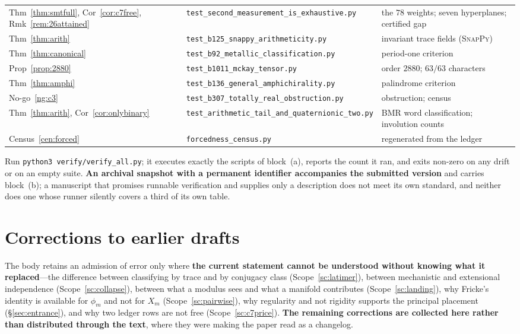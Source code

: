 \documentclass[11pt,reqno]{amsart}
\theoremstyle{plain}
\theoremstyle{definition}
\theoremstyle{remark}
\begin{document}
\begin{table}[h]
\begin{tabular}{@{}p{}p{}p{}@{}}
Thm~\ref{thm:smtfull}, Cor~\ref{cor:c7free}, Rmk~\ref{rem:26attained} & \texttt{test\_second\_measurement\_is\_exhaustive.py} & the $78$ weights; seven hyperplanes; certified gap\\
Thm~\ref{thm:arith} & \texttt{test\_b125\_snappy\_arithmeticity.py} & invariant trace fields (\textsc{SnapPy})\\
Thm~\ref{thm:canonical} & \texttt{test\_b92\_metallic\_classification.py} & period-one criterion\\
Prop~\ref{prop:2880} & \texttt{test\_b1011\_mckay\_tensor.py} & order $2880$; $63/63$ characters\\
Thm~\ref{thm:amphi} & \texttt{test\_b136\_general\_amphichirality.py} & palindrome criterion\\
No-go~\ref{ng:c3} & \texttt{test\_b307\_totally\_real\_obstruction.py} & obstruction; census\\
Thm~\ref{thm:arith}, Cor~\ref{cor:onlybinary} & \texttt{test\_arithmetic\_tail\_and\_quaternionic\_two.py} & BMR word classification; involution counts\\

Census~\ref{cen:forced} & \texttt{forcedness\_census.py} & regenerated from the ledger\\
\bottomrule
\end{tabular}
\end{table}

\noindent Run \texttt{python3 verify/verify\_all.py}; it executes exactly the scripts of
block~(a), reports the count it ran, and exits non-zero on any drift or on an empty
suite. \textbf{An archival snapshot with a permanent identifier accompanies the submitted
version} and carries block~(b); a manuscript that promises runnable verification and
supplies only a description does not meet its own standard, and neither does one whose
runner silently covers a third of its own table.

\section{Corrections to earlier drafts}\label{app:corrections}

The body retains an admission of error only where \textbf{the current statement cannot be
understood without knowing what it replaced}---the difference between classifying by
trace and by conjugacy class (Scope~\ref{sc:latimer}), between mechanistic and
extensional independence (Scope~\ref{sc:collapse}), between what a modulus sees and what
a manifold contributes (Scope~\ref{sc:landing}), why Fricke's identity is available for
$\phi_m$ and not for $X_m$ (Scope~\ref{sc:pairwise}), why regularity and not rigidity
supports the principal placement (\S\ref{sec:entrance}), and why two ledger rows are not
free (Scope~\ref{sc:c7price}). \textbf{The remaining corrections are collected here
rather than distributed through the text}, where they were making the paper read as a
changelog.
\end{document}
